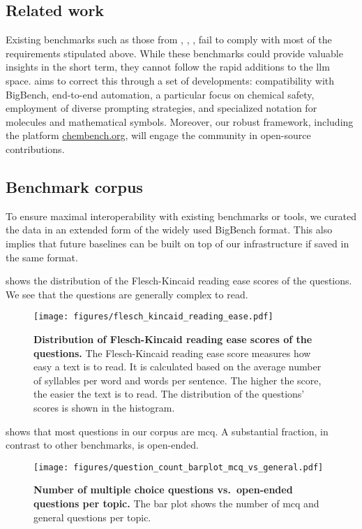 \subsection{Related work}
Existing benchmarks such as those from \textcite{guo2023large}, \textcite{sun2023scieval}, \textcite{Schulze_Balhorn_2024}, \textcite{Cai_2024} fail to comply with most of the requirements stipulated above. 
While these benchmarks could provide valuable insights in the short term, they cannot follow the rapid additions to the \gls{llm} space. 
\chembench aims to correct this through a set of developments: compatibility with BigBench, end-to-end automation, a particular focus on chemical safety, employment of diverse prompting strategies, and specialized notation for molecules and mathematical symbols. 
Moreover, our robust framework, including the platform \url{chembench.org}, will engage the community in open-source contributions.


\subsection{Benchmark corpus}
To ensure maximal interoperability with existing benchmarks or tools, we curated the data in an extended form of the widely used BigBench format.\autocite{srivastava2022beyond}
This also implies that future baselines can be built on top of our infrastructure if saved in the same format.


 shows the distribution of the Flesch-Kincaid reading ease scores of the questions.  
We see that the questions are generally complex to read. 

\begin{figure}[htb]
    \centering
    \texttt{[image: figures/flesch\_kincaid\_reading\_ease.pdf]}
    \caption{\textbf{Distribution of Flesch-Kincaid reading ease scores of the questions.} The Flesch-Kincaid reading ease score\autocite{flesch1948new} measures how easy a text is to read. It is calculated based on the average number of syllables per word and words per sentence. The higher the score, the easier the text is to read. The distribution of the questions' scores is shown in the histogram. }
    \label{fig:flesch_kincaid_reading_ease}
\end{figure}

 shows that most questions in our corpus are \gls{mcq}.
A substantial fraction, in contrast to other benchmarks, is open-ended. 
\begin{figure}[htb]
    \centering
    \texttt{[image: figures/question\_count\_barplot\_mcq\_vs\_general.pdf]}
    \caption{\textbf{Number of multiple choice questions vs.\ open-ended questions per topic.} The bar plot shows the number of \gls{mcq} and general questions per topic.}
    \label{fig:question_count_barplot_mcq_vs_general}
\end{figure}


